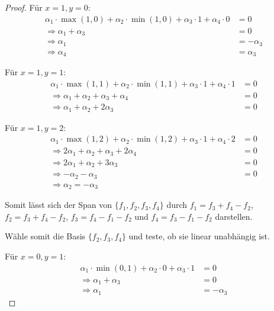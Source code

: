 \documentclass{../problemset}
\begin{document}
\begin{problem}
\begin{proof}
	Für $x = 1, y = 0$:
	\begin{align*}
		\alpha_1 \cdot \max(1, 0) + \alpha_2 \cdot \min(1, 0) + \alpha_3 \cdot 1 + \alpha_4 \cdot 0 & = 0         \\
		\Rightarrow \alpha_1 + \alpha_3                                                             & = 0         \\
		\Rightarrow \alpha_1                                                                        & = -\alpha_3 \\
		\Rightarrow \alpha_4                                                                        & = \alpha_3
	\end{align*}

	Für $x = 1, y = 1$:
	\begin{align*}
		\alpha_1 \cdot \max(1, 1) + \alpha_2 \cdot \min(1, 1) + \alpha_3 \cdot 1 + \alpha_4 \cdot 1 & = 0 \\
		\Rightarrow \alpha_1 + \alpha_2 + \alpha_3 + \alpha_4                                       & = 0 \\
		\Rightarrow \alpha_1 + \alpha_2 + 2 \alpha_3                                                & = 0
	\end{align*}

	Für $x = 1, y = 2$:
	\begin{align*}
		\alpha_1 \cdot \max(1, 2) + \alpha_2 \cdot \min(1, 2) + \alpha_3 \cdot 1 + \alpha_4 \cdot 2 & = 0 \\
		\Rightarrow 2\alpha_1 + \alpha_2 + \alpha_3 + 2\alpha_4                                     & = 0 \\
		\Rightarrow 2\alpha_1 + \alpha_2 + 3 \alpha_3                                               & = 0 \\
		\Rightarrow -\alpha_2 - \alpha_3                                                            & = 0 \\
		\Rightarrow \alpha_2 = - \alpha_3
	\end{align*}

	Somit lässt sich der Span von $\{f_1, f_2, f_3, f_4\}$ durch $f_1 = f_3 + f_4 - f_2$, $f_2 = f_3 + f_4 - f_2$, $f_3 = f_4 - f_1 - f_2$ und $f_4 = f_3 - f_1 - f_2$ darstellen.

	Wähle somit die Basis $\{f_2, f_3, f_4\}$ und teste, ob sie linear unabhängig ist.

	Für $x = 0, y = 1$:
	\begin{align*}
		\alpha_1 \cdot \min(0, 1) + \alpha_2 \cdot 0 + \alpha_3 \cdot 1 & = 0         \\
		\Rightarrow \alpha_1 + \alpha_3                                 & = 0         \\
		\Rightarrow \alpha_1                                            & = -\alpha_3
	\end{align*}


\end{proof}
\end{problem}
\end{document}
